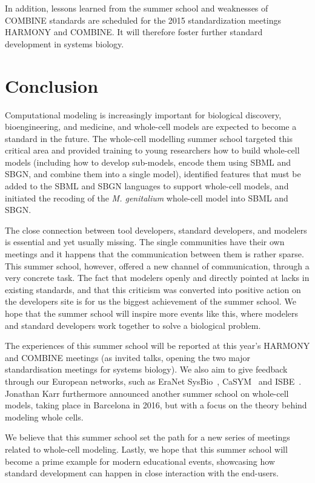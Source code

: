 \documentclass[journal,transmag]{IEEEtran}
\begin{document}
In addition, lessons learned from the summer school and weaknesses of COMBINE standards are scheduled for the 2015 standardization meetings HARMONY and COMBINE. It will therefore foster further standard development in systems biology. 

\section{Conclusion}
Computational modeling is increasingly important for biological discovery, bioengineering, and medicine, and whole-cell models are expected to become a standard in the future. 
The whole-cell modelling summer school targeted this critical area and provided training to young researchers how to build whole-cell models (including how to develop sub-models, encode them using SBML and SBGN, and combine them into a single model), identified features that must be added to the SBML and SBGN languages to support whole-cell models, and initiated the recoding of the \textit{M. genitalium} whole-cell model into SBML and SBGN.

The close connection between tool developers, standard developers, and modelers is essential and yet usually missing. 
The single communities have their own meetings and it happens that the communication between them is rather sparse. 
This summer school, however, offered a new channel of communication, through a very concrete task. 
The fact that modelers openly and directly pointed at lacks in existing standards, and that this criticism was converted into positive action on the developers site is for us the biggest achievement of the summer school. 
We hope that the summer school will inspire more events like this, where modelers and standard developers work together to solve a biological problem.

The experiences of this summer school will be reported at this year's HARMONY and COMBINE meetings (as invited talks, opening the two major standardisation meetings for
systems biology). 
We also aim to give feedback through our European networks, such as EraNet SysBio~\cite{ERASysBio2015}, CaSYM~\cite{CaSYM2015} and ISBE~\cite{Wolkenhauer2009}.
Jonathan Karr furthermore announced another summer school on whole-cell models, taking place in Barcelona in 2016, but with a focus on the theory behind modeling whole cells.

We believe that this summer school set the path for a new series of meetings related to whole-cell modeling.
Lastly, we hope that this summer school will become a prime example for modern educational events, showcasing how standard development can happen in close interaction with the end-users.
\end{document}
